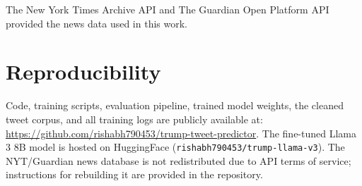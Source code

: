 \documentclass[11pt,a4paper]{article}
\begin{document}
The New York Times Archive API and The Guardian Open Platform API provided the news data used in this work.

\section*{Reproducibility}

Code, training scripts, evaluation pipeline, trained model weights, the cleaned tweet corpus, and all training logs are publicly available at: \url{https://github.com/rishabh790453/trump-tweet-predictor}. The fine-tuned Llama 3 8B model is hosted on HuggingFace (\texttt{rishabh790453/trump-llama-v3}). The NYT/Guardian news database is not redistributed due to API terms of service; instructions for rebuilding it are provided in the repository.


\end{document}
